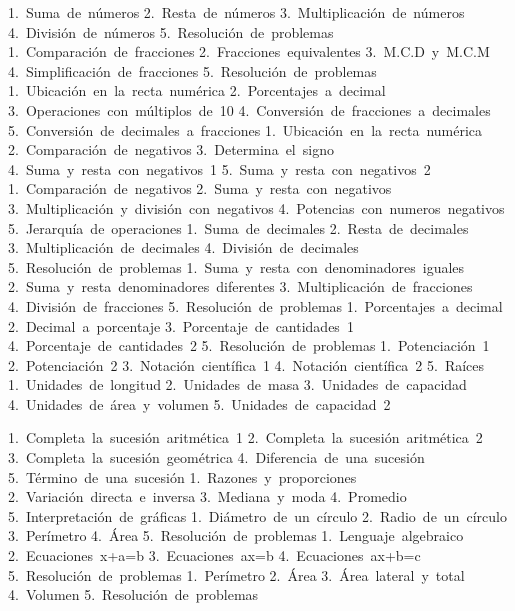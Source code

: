 1.~Suma~de~números
2.~Resta~de~números
3.~Multiplicación~de~números
4.~División~de~números
5.~Resolución~de~problemas
1.~Comparación~de~fracciones
2.~Fracciones~equivalentes
3.~M.C.D~y~M.C.M
4.~Simplificación~de~fracciones
5.~Resolución~de~problemas
1.~Ubicación~en~la~recta~numérica
2.~Porcentajes~a~decimal
3.~Operaciones~con~múltiplos~de~10
4.~Conversión~de~fracciones~a~decimales
5.~Conversión~de~decimales~a~fracciones
1.~Ubicación~en~la~recta~numérica
2.~Comparación~de~negativos
3.~Determina~el~signo
4.~Suma~y~resta~con~negativos~1
5.~Suma~y~resta~con~negativos~2
1.~Comparación~de~negativos
2.~Suma~y~resta~con~negativos
3.~Multiplicación~y~división~con~negativos
4.~Potencias~con~numeros~negativos
5.~Jerarquía~de~operaciones
1.~Suma~de~decimales
2.~Resta~de~decimales
3.~Multiplicación~de~decimales
4.~División~de~decimales
5.~Resolución~de~problemas
1.~Suma~y~resta~con~denominadores~iguales
2.~Suma~y~resta~denominadores~diferentes
3.~Multiplicación~de~fracciones
4.~División~de~fracciones
5.~Resolución~de~problemas
1.~Porcentajes~a~decimal
2.~Decimal~a~porcentaje
3.~Porcentaje~de~cantidades~1
4.~Porcentaje~de~cantidades~2
5.~Resolución~de~problemas
1.~Potenciación~1
2.~Potenciación~2
3.~Notación~científica~1
4.~Notación~científica~2
5.~Raíces
1.~Unidades~de~longitud
2.~Unidades~de~masa
3.~Unidades~de~capacidad
4.~Unidades~de~área~y~volumen
5.~Unidades~de~capacidad~2

1.~Completa~la~sucesión~aritmética~1
2.~Completa~la~sucesión~aritmética~2
3.~Completa~la~sucesión~geométrica
4.~Diferencia~de~una~sucesión
5.~Término~de~una~sucesión
1.~Razones~y~proporciones
2.~Variación~directa~e~inversa
3.~Mediana~y~moda
4.~Promedio
5.~Interpretación~de~gráficas
1.~Diámetro~de~un~círculo
2.~Radio~de~un~círculo
3.~Perímetro
4.~Área
5.~Resolución~de~problemas
1.~Lenguaje~algebraico
2.~Ecuaciones~x+a=b
3.~Ecuaciones~ax=b
4.~Ecuaciones~ax+b=c
5.~Resolución~de~problemas
1.~Perímetro
2.~Área
3.~Área~lateral~y~total
4.~Volumen
5.~Resolución~de~problemas